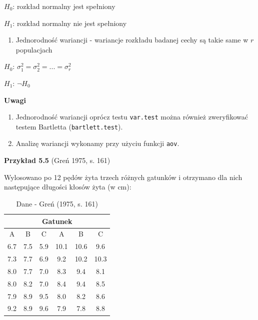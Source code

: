 \documentclass[12pt,B5paper,]{book}
\providecommand{\tightlist}{%
  \setlength{\itemsep}{0pt}\setlength{\parskip}{0pt}}
\begin{document}
\hspace*{5cm} \(H_0\): rozkład normalny jest spełniony

\hspace*{5cm} \(H_1\): rozkład normalny nie jest spełniony

\begin{enumerate}
\def\labelenumi{\arabic{enumi}.}
\setcounter{enumi}{2}
\tightlist
\item
  Jednorodność wariancji - wariancje rozkładu badanej cechy są takie
  same w \(r\) populacjach
\end{enumerate}

\hspace*{5cm} \(H_0\): \(\sigma_1^2 = \sigma_2^2 = ... = \sigma_r^2\)

\hspace*{5cm} \(H_1\): \(\neg H_0\)

\textbf{Uwagi}

\begin{enumerate}
\def\labelenumi{\arabic{enumi})}
\item
  Jednorodność wariancji oprócz testu \texttt{var.test} można również
  zweryfikować testem Bartletta (\texttt{bartlett.test}).
\item
  Analizę wariancji wykonamy przy użyciu funkcji \texttt{aov}.
\end{enumerate}

\newpage

\textbf{Przykład 5.5} (Greń 1975, s. 161)

Wylosowano po 12 pędów żyta trzech różnych gatunków i otrzymano dla nich
następujące długości kłosów żyta (w cm):

\begin{table}[H]
\centering
\caption{Dane - Greń (1975, s. 161)}
\label{klosy}
\begin{tabular}{ccc|ccc}
\hline
\multicolumn{6}{c}{Gatunek}  \\ \hline
A       & B       & C       & A       & B       & C       \\
6.7     & 7.5     & 5.9     & 10.1    & 10.6    & 9.6     \\
7.3     & 7.7     & 6.9     & 9.2     & 10.2    & 10.3    \\
8.0     & 7.7     & 7.0     & 8.3     & 9.4     & 8.1     \\
8.0     & 8.2     & 7.0     & 8.4     & 9.4     & 8.5     \\
7.9     & 8.9     & 9.5     & 8.0     & 8.2     & 8.6     \\
9.2     & 8.9     & 9.6     & 7.9     & 7.8     & 8.8    \\ \hline
\end{tabular}
\end{table}
\end{document}
